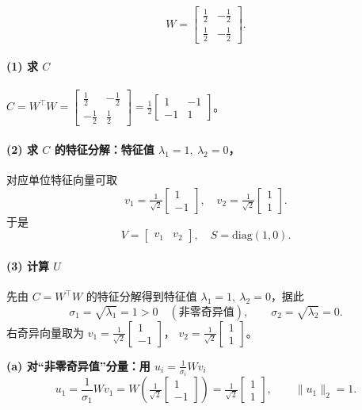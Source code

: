 \documentclass[../main.tex]{subfiles}
\begin{document}
\begin{enumerate}
\begin{itemize}
\[
W=\begin{bmatrix}\tfrac12&-\tfrac12\\[2pt]\tfrac12&-\tfrac12\end{bmatrix}.
\]

\paragraph{(1) 求 $C$}

$C=W^\top W=\begin{bmatrix}\tfrac12&-\tfrac12\\[2pt]-\tfrac12&\tfrac12\end{bmatrix}
=\tfrac12\!\begin{bmatrix}1&-1\\-1&1\end{bmatrix}$。

\paragraph{(2) 求 $C$ 的特征分解：特征值 $\lambda_1=1,\ \lambda_2=0$，}
对应单位特征向量可取
\[
v_1=\tfrac{1}{\sqrt2}\!\begin{bmatrix}1\\[-2pt]-1\end{bmatrix},\quad
v_2=\tfrac{1}{\sqrt2}\!\begin{bmatrix}1\\[ -2pt]1\end{bmatrix}.
\]
于是
\[
V=\begin{bmatrix}v_1&v_2\end{bmatrix},\quad
S=\mathrm{diag}(1,0).
\]


\paragraph{(3) 计算 $U$}

先由 $C=W^\top W$ 的特征分解得到特征值 $\lambda_1=1,\ \lambda_2=0$，据此
\[
\sigma_1=\sqrt{\lambda_1}=1>0\quad(\text{非零奇异值}),\qquad
\sigma_2=\sqrt{\lambda_2}=0.
\]
右奇异向量取为 $v_1=\tfrac{1}{\sqrt{2}}\!\begin{bmatrix}1\\[-2pt]-1\end{bmatrix}$，
$v_2=\tfrac{1}{\sqrt{2}}\!\begin{bmatrix}1\\[-2pt]1\end{bmatrix}$。

\medskip
\noindent\textbf{(a) 对“非零奇异值”分量：用 $u_i=\frac{1}{\sigma_i}Wv_i$}
\[
u_1=\frac{1}{\sigma_1}Wv_1
= W\!\left(\tfrac{1}{\sqrt2}\!\begin{bmatrix}1\\[-2pt]-1\end{bmatrix}\right)
=\tfrac{1}{\sqrt2}\!\begin{bmatrix}1\\[2pt]1\end{bmatrix},\qquad \|u_1\|_2=1.
\]


\end{itemize}
\end{enumerate}
\end{document}
